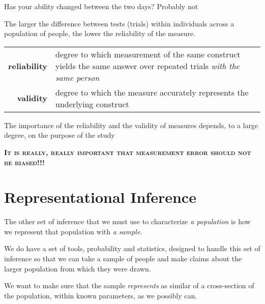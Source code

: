\documentclass[11pt]{lecturenotes}
\begin{document}
Has your ability changed between the two days? Probably not

The larger the difference between tests (trials) within individuals across a population of people, the lower the reliability of the measure. 

\slide
\begin{center}
\begin{tabular}{rp{3in}}
\textbf{reliability} & degree to which measurement of the same construct yields the same answer over repeated trials \emph{with the same person}\\[.5em]
\textbf{validity} & degree to which the measure accurately represents the underlying construct
\end{tabular}
\end{center}

The importance of the reliability and the validity of measures depends, to a large degree, on the purpose of the study

\slide
\textbf{\textsc{It is really, really important that measurement error should not be biased!!!}}

\section[5]{Representational Inference}
The other set of inference that we must use to characterize \emph{a population} is how we represent that population with \emph{a sample}.

\slide
\begin{center}
\end{center}

We do have a set of tools, probability and statistics, designed to handle this set of inference so that we can take a sample of people and make claims about the larger population from which they were drawn. 

We want to make sure that the sample \emph{represents} as similar of a cross-section of the population, within known parameters, as we possibly can. 
\end{document}
